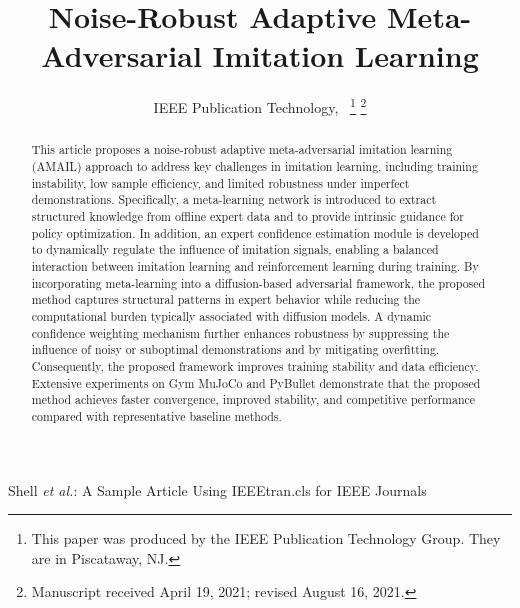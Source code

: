\documentclass[lettersize,journal]{IEEEtran}
\begin{document}
\title{Noise-Robust Adaptive Meta-Adversarial Imitation Learning}

\author{IEEE Publication Technology,~
\thanks{This paper was produced by the IEEE Publication Technology Group. They are in Piscataway, NJ.}%
\thanks{Manuscript received April 19, 2021; revised August 16, 2021.}}

%
{Shell \MakeLowercase{\textit{et al.}}: A Sample Article Using IEEEtran.cls for IEEE Journals}


\maketitle

\begin{abstract}
This article proposes a noise-robust adaptive meta-adversarial imitation learning (AMAIL) approach to address key challenges in imitation learning, including training instability, low sample efficiency, and limited robustness under imperfect demonstrations. Specifically, a meta-learning network is introduced to extract structured knowledge from offline expert data and to provide intrinsic guidance for policy optimization. In addition, an expert confidence estimation module is developed to dynamically regulate the influence of imitation signals, enabling a balanced interaction between imitation learning and reinforcement learning during training.
By incorporating meta-learning into a diffusion-based adversarial framework, the proposed method captures structural patterns in expert behavior while reducing the computational burden typically associated with diffusion models. 
A dynamic confidence weighting mechanism further enhances robustness by suppressing the influence of noisy or suboptimal demonstrations and by mitigating overfitting. Consequently, the proposed framework improves training stability and data efficiency.
Extensive experiments on Gym MuJoCo and PyBullet demonstrate that the proposed method achieves faster convergence, improved stability, and competitive performance compared with representative baseline methods.
\end{abstract}
\end{document}
